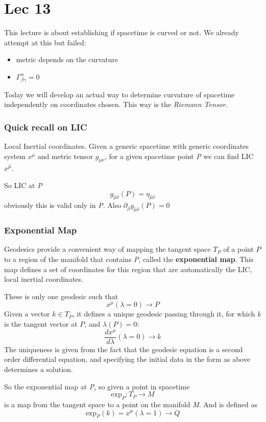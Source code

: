 \section{Lec 13}
This lecture is about establishing if spacetime is curved or not. We already attempt at this but failed:
\begin{itemize}
\item metric depends on the curvature
\item $\Gamma ^{\alpha }_{\beta \gamma } = 0$
\end{itemize}
Today we will develop an actual way to determine curvature of spacetime independently on coordinates chosen. This way is the \emph{Riemann Tensor.}\par

\subsubsection{Quick recall on LIC}
Local Inertial coordinates. Given a generic spacetime with generic coordinates system $x^{\mu }$ and metric tensor $g_{\mu \nu }$, for a given spacetime point \emph{P} we can find LIC $x^{\hat{\mu }}$. \par
So LIC at \emph{P} 
\begin{equation}
g_{\hat{\mu }\hat{\nu }} \left( P \right) = \eta _{\hat{\mu }\hat{\nu }}	
\end{equation}
obviously this is valid only in \emph{P}. Also $\partial_{\hat{\rho }} g_{\hat{\mu }\hat{\nu }} \left( P \right) = 0$

\subsubsection{Exponential Map}

Geodesics provide a convenient way of mapping the tangent space $T_{P}$ of a point $P$ to a region of the manifold that contains \emph{P}, called the \textbf{exponential map}. This map defines a set of coordinates for this region that are automatically the LIC, local inertial coordinates. \par
These is only one geodesic such that 
\[
x^{\mu }\left( \lambda = 0 \right) \to P
\]
Given a vector $k \in T_{P}$, it defines a unique geodesic passing through it, for which \emph{k} is the tangent vector at $P$, and $\lambda \left( P \right) = 0$:
\[
\frac{d x^{\mu }}{d \lambda } \left( \lambda =0 \right) \to k
\]
The uniqueness is given from the fact that the geodesic equation is a second order differential equation, and specifying the initial data in the form as above determines a solution.\par
So the exponential map at \emph{P}, so given a point in spacetime  
\begin{equation}
	\text{exp}_{P} : T_{P} \to M
\end{equation}
is a map from the tangent space to a point on the manifold \emph{M}. And is defined as
\begin{equation}
	\text{exp}_{P}\left( k \right) = x^{\mu }\left( \lambda =1 \right) \to Q
\end{equation}


